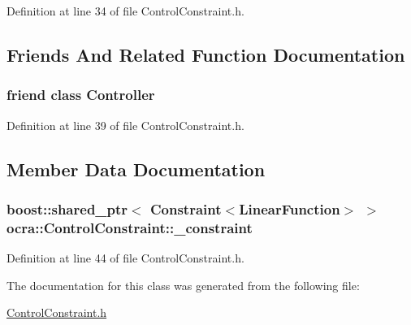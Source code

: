 Definition at line 34 of file Control\+Constraint.\+h.



\subsection{Friends And Related Function Documentation}
\subsubsection[{\texorpdfstring{Controller}{Controller}}]{\setlength{\rightskip}{0pt plus 5cm}friend class {\bf Controller}\hspace{0.3cm}{\ttfamily [friend]}}\hypertarget{classocra_1_1ControlConstraint_ac3456fd331a58b288082abca310c7a99}{}\label{classocra_1_1ControlConstraint_ac3456fd331a58b288082abca310c7a99}


Definition at line 39 of file Control\+Constraint.\+h.



\subsection{Member Data Documentation}
\subsubsection[{\texorpdfstring{\+\_\+constraint}{_constraint}}]{\setlength{\rightskip}{0pt plus 5cm}boost\+::shared\+\_\+ptr$<$ {\bf Constraint}$<${\bf Linear\+Function}$>$ $>$ ocra\+::\+Control\+Constraint\+::\+\_\+constraint\hspace{0.3cm}{\ttfamily [protected]}}\hypertarget{classocra_1_1ControlConstraint_a47cebded91be870b03e1dddc7b0c215b}{}\label{classocra_1_1ControlConstraint_a47cebded91be870b03e1dddc7b0c215b}


Definition at line 44 of file Control\+Constraint.\+h.



The documentation for this class was generated from the following file\+:\begin{DoxyCompactItemize}
\item 
\hyperlink{ControlConstraint_8h}{Control\+Constraint.\+h}\end{DoxyCompactItemize}
